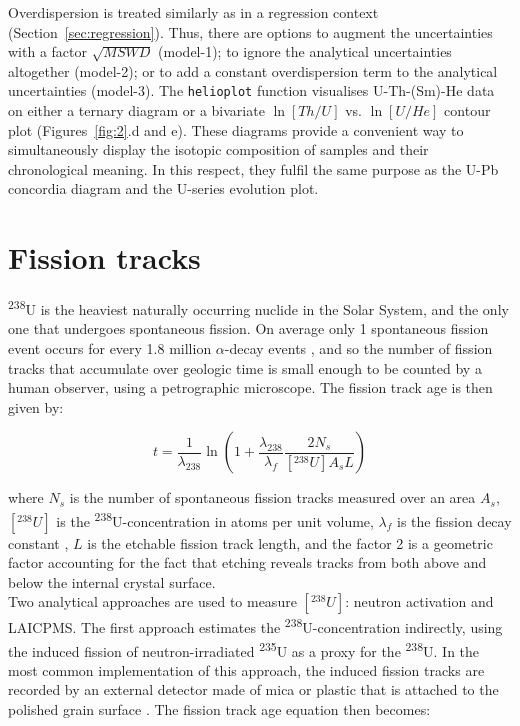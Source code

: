 \documentclass{article}
\begin{document}
Overdispersion is treated similarly as in a regression context
(Section~\ref{sec:regression}).  Thus, there are options to augment
the uncertainties with a factor $\sqrt{MSWD}$ (model-1); to ignore the
analytical uncertainties altogether (model-2); or to add a constant
overdispersion term to the analytical uncertainties (model-3).  The
\texttt{helioplot} function visualises U-Th-(Sm)-He data on either a
ternary diagram or a bivariate $\ln[Th/U]$ vs. $\ln[U/He]$ contour
plot (Figures~\ref{fig:2}.d and e). These diagrams provide a
convenient way to simultaneously display the isotopic composition of
samples and their chronological meaning. In this respect, they fulfil
the same purpose as the U-Pb concordia diagram and the U-series
evolution plot.

\section{Fission tracks}
\label{sec:FT}

\textsuperscript{238}U is the heaviest naturally occurring nuclide in
the Solar System, and the only one that undergoes spontaneous fission.
On average only 1 spontaneous fission event occurs for every 1.8
million $\alpha$-decay events \citep{holden2000}, and so the number of
fission tracks that accumulate over geologic time is small enough to
be counted by a human observer, using a petrographic microscope. The
fission track age is then given by:

\begin{equation}
  t = \frac{1}{\lambda_{238}}
  \ln\left(
  1 + \frac{\lambda_{238}}{\lambda_f}\frac{2 N_s}{[{}^{238}U]A_sL}
  \right)
  \label{eq:FT}
\end{equation}

\noindent where $N_s$ is the number of spontaneous fission tracks
measured over an area $A_s$, $[{}^{238}U]$ is the
\textsuperscript{238}U-concentration in atoms per unit volume,
$\lambda_f$ is the fission decay constant \citep[$8.5 \times
  {10}^{-17}$ yr\textsuperscript{-1},][]{holden2000}, $L$ is the
etchable fission track length, and the factor 2 is a geometric factor
accounting for the fact that etching reveals tracks from both above
and below the internal crystal surface.\\

Two analytical approaches are used to measure $[{}^{238}U]$: neutron
activation and LAICPMS. The first approach estimates the
\textsuperscript{238}U-concentration indirectly, using the induced
fission of neutron-irradiated \textsuperscript{235}U as a proxy for
the \textsuperscript{238}U. In the most common implementation of this
approach, the induced fission tracks are recorded by an external
detector made of mica or plastic that is attached to the polished
grain surface \citep{fleischer1972, hurford1983}. The fission track
age equation then becomes:
\end{document}
